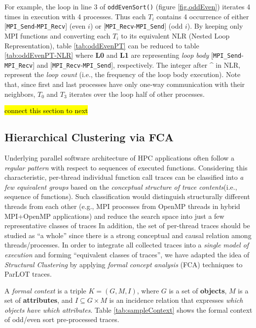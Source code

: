 For example, the loop in line 3 of \texttt{oddEvenSort()} (figure \ref{fig.oddEven}) iterates 4 times in execution with 4 processes. Thus each $T_i$ contains 4 occurrence of either [\texttt{MPI\_Send}-\texttt{MPI\_Recv}] (even $i$) or [\texttt{MPI\_Recv}-\texttt{MPI\_Send}] (odd $i$). By keeping only MPI functions and converting each $T_i$ to its equivalent NLR (Nested Loop Representation), table \ref{tab:oddEvenPT} can be reduced to table \ref{tab:oddEvenPT-NLR} where \textbf{L0} and \textbf{L1} are representing \textit{loop body} [\texttt{MPI\_Send}-\texttt{MPI\_Recv}] and [\texttt{MPI\_Recv}-\texttt{MPI\_Send}], respectively. The integer after \^{} in NLR, represent the \textit{loop count} (i.e., the frequency of the loop body execution). Note that, since first and last processes have only one-way communication with their neighbors, $T_0$ and $T_3$ iterates over the loop half of other processes.

\hl{connect this section to next}


\subsection{Hierarchical Clustering via FCA}
Underlying parallel software architecture of HPC applications often follow a \textit{regular pattern} with respect to sequences of executed functions. 
%
Considering this characteristic, per-thread individual function call traces can be classified into \textit{a few equivalent groups} based on the \textit{conceptual structure of trace contents}(i.e., sequence of functions).
% 
Such classification would distinguish structurally different threads from each other (e.g., MPI processes from OpenMP threads in hybrid MPI+OpenMP applications) and reduce the search space into just a few representative classes of traces
%
In addition, the set of per-thread traces should be studied as ``a whole'' since there is a strong conceptual and causal relation among threads/processes.
%
In order to integrate all collected traces into a \textit{single model of execution} and forming ``equivalent classes of traces'', we have adapted the idea of \textit{Structural Clustering}  \cite{weberStructural} by applying \textit{formal concept analysis} (FCA)\cite{clbook} techniques to ParLOT traces.
%

A \textit{formal context} is a triple $K = (G, M, I)$, where $G$ is a set of \textbf{objects}, $M$ is a set of \textbf{attributes}, and $I \subseteq G \times M$ is an incidence relation that expresses \textit{which objects have which attributes}. Table \ref{tab:sampleContext} shows the formal context of odd/even sort pre-processed traces. 

